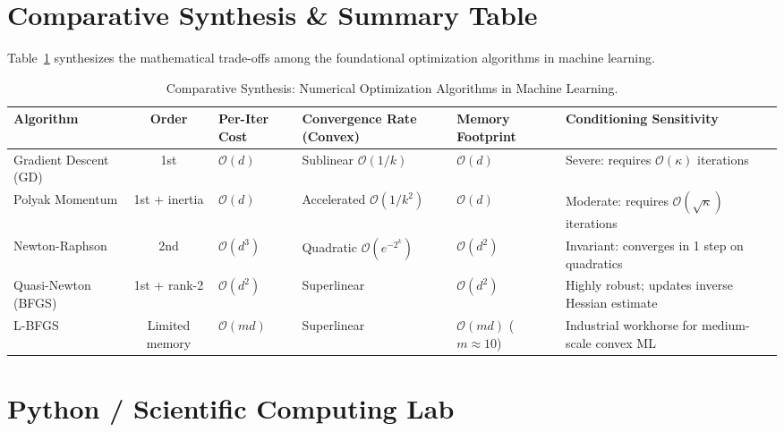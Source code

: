 \section{Comparative Synthesis \& Summary Table}

Table~\ref{tab:optim_algorithms} synthesizes the mathematical trade-offs among the foundational optimization algorithms in machine learning.

\begin{table}[htbp]
\centering
\footnotesize
\setlength{\tabcolsep}{3.5pt}
\begin{tabularx}{\textwidth}{lc>{\raggedright}p{2.0cm}>{\raggedright\arraybackslash}X>{\raggedright}p{2.2cm}>{\raggedright\arraybackslash}X}
\toprule
\textbf{Algorithm} & \textbf{Order} & \textbf{Per-Iter Cost} & \textbf{Convergence Rate (Convex)} & \textbf{Memory Footprint} & \textbf{Conditioning Sensitivity} \\
\midrule
Gradient Descent (GD) & 1st & $\mathcal{O}(d)$ & Sublinear $\mathcal{O}(1/k)$ & $\mathcal{O}(d)$ & Severe: requires $\mathcal{O}(\kappa)$ iterations \\
\addlinespace
Polyak Momentum & 1st + inertia & $\mathcal{O}(d)$ & Accelerated $\mathcal{O}(1/k^2)$ & $\mathcal{O}(d)$ & Moderate: requires $\mathcal{O}(\sqrt{\kappa})$ iterations \\
\addlinespace
Newton-Raphson & 2nd & $\mathcal{O}(d^3)$ & Quadratic $\mathcal{O}(e^{-2^k})$ & $\mathcal{O}(d^2)$ & Invariant: converges in 1 step on quadratics \\
\addlinespace
Quasi-Newton (BFGS) & 1st + rank-2 & $\mathcal{O}(d^2)$ & Superlinear & $\mathcal{O}(d^2)$ & Highly robust; updates inverse Hessian estimate \\
\addlinespace
L-BFGS & Limited memory & $\mathcal{O}(m d)$ & Superlinear & $\mathcal{O}(m d)$ ($m \approx 10$) & Industrial workhorse for medium-scale convex ML \\
\bottomrule
\end{tabularx}
\caption{Comparative Synthesis: Numerical Optimization Algorithms in Machine Learning.}
\label{tab:optim_algorithms}
\end{table}

\section{Python / Scientific Computing Lab}

